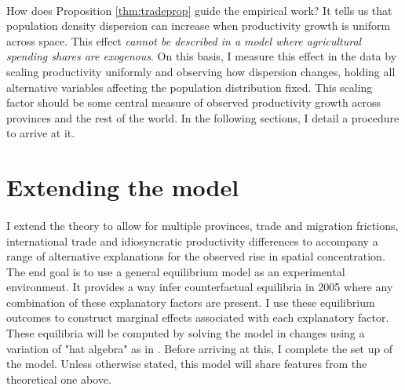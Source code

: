 \documentclass[]{article}
\theoremstyle{plain}
\begin{document}
\paragraph*{}
How does Proposition \ref{thm:tradeprop} guide the empirical work? It tells us that population density dispersion can increase when productivity growth is uniform across space. This effect \textit{cannot be described in a model where agricultural spending shares are exogenous}. On this basis, I measure this effect in the data by scaling productivity uniformly and observing how dispersion changes, holding all alternative variables affecting the population distribution fixed. This scaling factor should be some central measure of observed productivity growth across provinces and the rest of the world. In the following sections, I detail a procedure to arrive at it. 

\section{Extending the model}\label{section:structmodel}

\paragraph*{}

I extend the theory to allow for multiple provinces, trade and migration frictions, international trade and idiosyncratic productivity differences to accompany a range of alternative explanations for the observed rise in spatial concentration. The end goal is to use a general equilibrium model as an experimental environment. It provides a way infer counterfactual equilibria in 2005 where any combination of these explanatory factors are present. I use these equilibrium outcomes to construct marginal effects associated with each explanatory factor. These equilibria will be computed by solving the model in changes using a variation of "hat algebra" as in \citet*{dekle}. Before arriving at this, I complete the set up of the model. Unless otherwise stated, this model will share features from the theoretical one above. 
\end{document}
